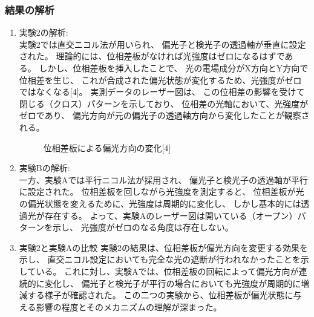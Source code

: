 \documentclass{article}
\begin{document}
\subsubsection*{結果の解析}
\begin{enumerate}[label=\arabic*), before=\begin{spacing}{1.2}, after=\end{spacing}] %
    \item 実験2の解析: \\
    実験2では直交ニコル法が用いられ、
    偏光子と検光子の透過軸が垂直に設定された。
    理論的には、位相差板がなければ光強度はゼロになるはずである。
    しかし、位相差板を挿入したことで、
    光の電場成分がX方向とY方向で位相差を生じ、
    これが合成された偏光状態が変化するため、光強度がゼロではなくなる[4]。
    実測データのレーザー図は、
    この位相差の影響を受けて閉じる（クロス）パターンを示しており、
    位相差の光軸において、光強度がゼロであり、
    偏光方向が元の偏光子の透過軸方向から変化したことが観察される。
    \begin{figure}[!htb] %
        \centering
        \caption{位相差板による偏光方向の変化[4]}
        \label{fig:12}
    \end{figure}
    \FloatBarrier
    \item 実験Bの解析: \\
    一方、実験Aでは平行ニコル法が採用され、
    偏光子と検光子の透過軸が平行に設定された。
    位相差板を回しながら光強度を測定すると、
    位相差板が光の偏光状態を変えるために、光強度は周期的に変化し、
    しかし基本的には透過光が存在する。
    よって、実験Aのレーザー図は開いている（オープン）パターンを示し、
    光強度がゼロのなる角度は存在しない。
    \item 実験2と実験Aの比較
    実験2の結果は、位相差板が偏光方向を変更する効果を示し、
    直交ニコル設定においても完全な光の遮断が行われなかったことを示している。
    これに対し、実験Aでは、位相差板の回転によって偏光方向が連続的に変化し、
    偏光子と検光子が平行の場合においても光強度が周期的に増減する様子が確認された。
    この二つの実験から、位相差板が偏光状態に与える影響の程度とそのメカニズムの理解が深まった。
\end{enumerate}
\end{document}
